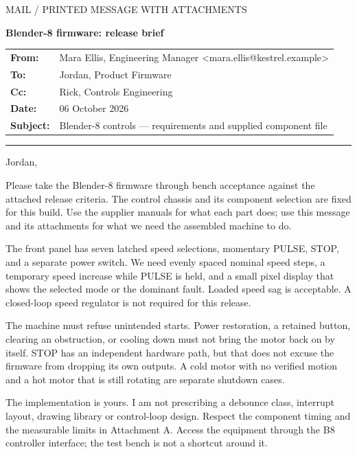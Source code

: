 \documentclass[10pt]{article}
\begin{document}
{\small\color{Muted}MAIL / PRINTED MESSAGE WITH ATTACHMENTS\par}\vspace{7pt}
{\LARGE\bfseries Blender-8 firmware: release brief\par}\vspace{12pt}

\begin{tabularx}{\linewidth}{@{}p{18mm} Y@{}}
\textbf{From:} & Mara Ellis, Engineering Manager \textless mara.ellis@kestrel.example\textgreater\\
\textbf{To:} & Jordan, Product Firmware\\
\textbf{Cc:} & Rick, Controls Engineering\\
\textbf{Date:} & 06 October 2026\\
\textbf{Subject:} & Blender-8 controls --- requirements and supplied component file\\
\end{tabularx}

\vspace{9pt}\hrule\vspace{12pt}
Jordan,

Please take the Blender-8 firmware through bench acceptance against the attached release criteria. The control chassis and its component selection are fixed for this build. Use the supplier manuals for what each part does; use this message and its attachments for what we need the assembled machine to do.

The front panel has seven latched speed selections, momentary PULSE, STOP, and a separate power switch. We need evenly spaced nominal speed steps, a temporary speed increase while PULSE is held, and a small pixel display that shows the selected mode or the dominant fault. Loaded speed sag is acceptable. A closed-loop speed regulator is not required for this release.

The machine must refuse unintended starts. Power restoration, a retained button, clearing an obstruction, or cooling down must not bring the motor back on by itself. STOP has an independent hardware path, but that does not excuse the firmware from dropping its own outputs. A cold motor with no verified motion and a hot motor that is still rotating are separate shutdown cases.

The implementation is yours. I am not prescribing a debounce class, interrupt layout, drawing library or control-loop design. Respect the component timing and the measurable limits in Attachment A. Access the equipment through the B8 controller interface; the test bench is not a shortcut around it.
\end{document}
